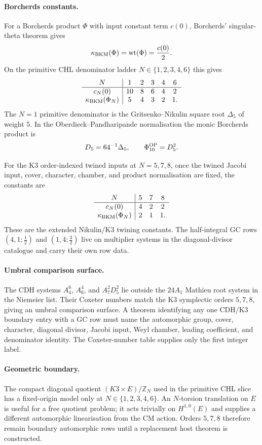 \paragraph{Borcherds constants.}
For a Borcherds product $\Phi$ with input constant term $c(0)$,
Borcherds' singular-theta theorem gives
\[
  \kappa_{\mathrm{BKM}}(\Phi)=\mathrm{wt}(\Phi)=\frac{c(0)}{2}.
\]
On the primitive CHL denominator ladder $N\in\{1,2,3,4,6\}$ this gives
\[
\begin{array}{c|ccccc}
N & 1 & 2 & 3 & 4 & 6 \\ \hline
c_N(0) & 10 & 8 & 6 & 4 & 2 \\
\kappa_{\mathrm{BKM}}(\Phi_N) & 5 & 4 & 3 & 2 & 1 .
\end{array}
\]
The $N=1$ primitive denominator is the Gritsenko--Nikulin square root
$\Delta_5$ of weight $5$.  In the Oberdieck--Pandharipande
normalisation the monic Borcherds product is
\[
  D_5=64^{-1}\Delta_5,\qquad
  \Phi_{10}^{\mathrm{OP}}=D_5^2.
\]

For the K3 order-indexed twined inputs at $N=5,7,8$, once the twined
Jacobi input, cover, character, chamber, and product normalisation are
fixed, the constants are
\[
\begin{array}{c|ccc}
N & 5 & 7 & 8 \\ \hline
c_N(0) & 4 & 2 & 2 \\
\kappa_{\mathrm{BKM}}(\Phi_N) & 2 & 1 & 1 .
\end{array}
\]
These are the extended Nikulin/K3 twining constants.  The
half-integral GC rows $(4,1;\tfrac12)$ and $(1,4;\tfrac32)$ live on
multiplier systems in the diagonal-divisor catalogue and carry their
own row data.

\paragraph{Umbral comparison surface.}
The CDH systems $A_4^6$, $A_6^4$, and $A_7^2D_5^2$ lie outside the
$24A_1$ Mathieu root system in the Niemeier list. Their Coxeter
numbers match the K3 symplectic orders $5,7,8$, giving an umbral
comparison surface.  A theorem identifying any one CDH/K3 boundary
entry with a GC row must name the automorphic group, cover, character,
diagonal divisor, Jacobi input, Weyl chamber, leading coefficient, and
denominator identity.  The Coxeter-number table supplies only the first
integer label.

\paragraph{Geometric boundary.}
The compact diagonal quotient $(K3\times E)/\mathbb Z_N$ used in the
primitive CHL slice has a fixed-origin model only at
$N\in\{1,2,3,4,6\}$.  An $N$-torsion translation on $E$ is useful for a
free quotient problem; it acts trivially on $H^{1,0}(E)$ and supplies a
different automorphic linearisation from the CM action.  Orders
$5,7,8$ therefore remain boundary automorphic rows until a replacement
host theorem is constructed.

